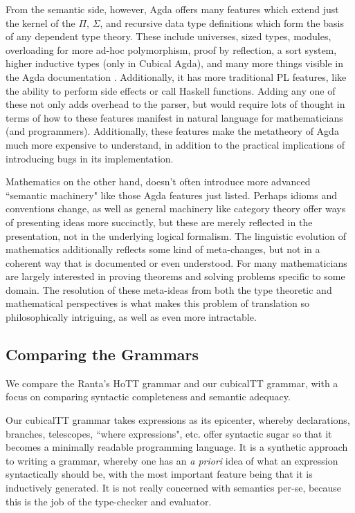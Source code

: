 From the semantic side, however, Agda offers many features which extend just the
kernel of the $\Pi$, $\Sigma$, and recursive data type definitions which form
the basis of any dependent type theory. These include universes, sized types,
modules, overloading for more ad-hoc polymorphism, proof by reflection, a sort
system, higher inductive types (only in Cubical Agda), and many more things
visible in the Agda documentation \cite{agdaDocs}. Additionally, it has more
traditional PL features, like the ability to perform side effects or call
Haskell functions. Adding any one of these not only adds overhead to the parser,
but would require lots of thought in terms of how to these features manifest in
natural language for mathematicians (and programmers). Additionally, these
features make the metatheory of Agda much more expensive to understand, in
addition to the practical implications of introducing bugs in its
implementation.

Mathematics on the other hand, doesn't often introduce more advanced ``semantic
machinery" like those Agda features just listed. Perhaps idioms and conventions
change, as well as general machinery like category theory offer ways of presenting
ideas more succinctly, but these are merely reflected in the presentation, not
in the underlying logical formalism. The linguistic evolution of mathematics
additionally reflects some kind of meta-changes, but not in a coherent way that
is documented or even understood. For many mathematicians are largely interested
in proving theorems and solving problems specific to some domain. The resolution
of these meta-ideas from both the type theoretic and mathematical perspectives
is what makes this problem of translation so philosophically intriguing, as well
as even more intractable.

\subsection{Comparing the Grammars}

We compare the Ranta's HoTT grammar and our cubicalTT grammar, with a focus on
comparing syntactic completeness and semantic adequacy.

Our cubicalTT grammar takes expressions as its epicenter, whereby
declarations, branches, telescopes, ``where expressions", etc. offer syntactic
sugar so that it becomes a minimally readable programming language. It is a
synthetic approach to writing a grammar, whereby one has an \emph{a priori} idea of
what an expression syntactically should be, with the most important feature
being that it is inductively generated. It is not really concerned with
semantics per-se, because this is the job of the type-checker and evaluator.

